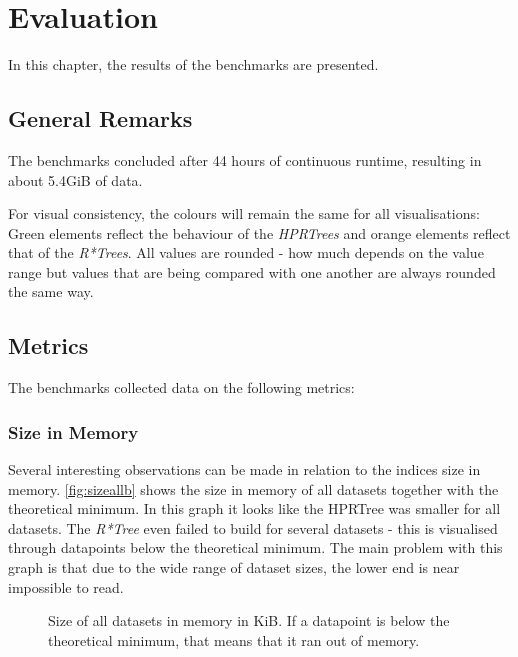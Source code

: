 
\chapter{Evaluation}
\label{chap:eval}

In this chapter, the results of the benchmarks are presented.

\section{General Remarks}

The benchmarks concluded after 44 hours of continuous runtime, resulting in about 5.4GiB of data.%

For visual consistency, the colours will remain the same for all visualisations: Green elements reflect the behaviour of the \textit{HPRTrees} and orange elements reflect that of the \textit{R*Trees}. All values are rounded - how much depends on  the value range but values that are being compared with one another are always rounded the same way.  %

\section{Metrics}

The benchmarks collected data on the following metrics:

\subsection{Size in Memory}

Several interesting observations can be made in relation to the indices size in memory. \autoref{fig:sizeallb} shows the size in memory of all datasets together with the theoretical minimum. In this graph it looks like the \acs{HPRTree} was smaller for all datasets. The \textit{R*Tree} even failed to build for several datasets - this is visualised through datapoints below the theoretical minimum. The main problem with this graph is that due to the wide range of dataset sizes, the lower end is near impossible to read.

\begin{figure}[H]
    \centering
    
    \caption[Size of all datasets in memory in KiB.]{Size of all datasets in memory in KiB. If a datapoint is below the theoretical minimum, that means that it ran out of memory.}
    \label{fig:sizeallb}
\end{figure}

